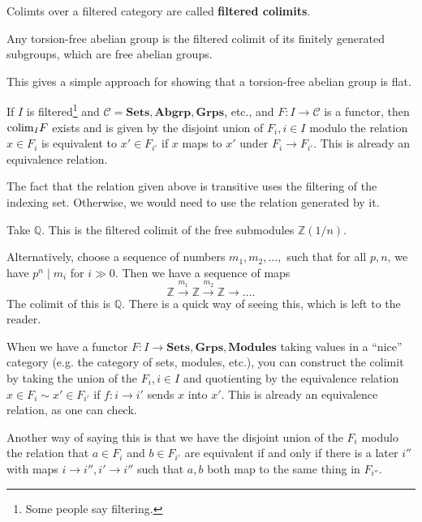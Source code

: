 \begin{definition} 
Colimts over a filtered category are called \textbf{filtered colimits}.
\end{definition} 

\begin{example} 
Any torsion-free abelian group is the filtered colimit of its finitely
generated subgroups, which are free abelian groups.  
\end{example} 
This gives a simple approach for showing that a torsion-free abelian group is
flat.

\begin{proposition} 
If $I$ is filtered\footnote{Some people say filtering.} and $\mathcal{C} =
\mathbf{Sets}, \mathbf{Abgrp}, \mathbf{Grps}$, etc., and $F: I \to \mathcal{C}$
is a functor, then $\mathrm{colim}_I F$ exists and is given by the disjoint union of
$F_i, i \in I$ modulo the relation $x \in F_i$ is equivalent to $x' \in F_{i'}$
if $x$ maps to $x'$ under $F_i \to F_{i'}$. This is already an equivalence
relation. 
\end{proposition} 

The fact that the relation given above is transitive uses the filtering of the
indexing set. Otherwise, we would need to use the relation generated by it. 

\begin{example} 
Take $\mathbb{Q}$. This is the filtered colimit of the free submodules
$\mathbb{Z}(1/n)$.

Alternatively, choose a sequence of numbers $m_1 , m_2, \dots, $ such that for
all $p, n$, we have $p^n \mid m_i$ for $i \gg 0$. Then we have a sequence of
maps
\[ \mathbb{Z} \stackrel{m_1}{\to} \mathbb{Z} \stackrel{m_2}{\to}\mathbb{Z}
\to \dots.   \]
The colimit of this is $\mathbb{Q}$. There is a quick way of seeing this, which
is left to the reader.
\end{example} 

When we have a functor $F: I \to \mathbf{Sets}, \mathbf{Grps},
\mathbf{Modules}$ taking values in a ``nice'' category (e.g. the category of
sets, modules, etc.), you can construct the colimit by taking the union of the
$F_i, i \in I$ and quotienting by the equivalence relation $x \in F_i \sim x'
\in F_{i'}$ if $f: i \to i'$ sends $x$ into $x'$. This is already an
equivalence relation, as one can check. 

Another way of saying this is that we have the disjoint union of the $F_i$
modulo the relation that $a \in F_i$ and $b \in F_{i'}$ are equivalent if and
only if there is a later $i''$ with maps $i \to i'', i' \to i''$ such that
$a,b$ both map to the same thing in $F_{i''}$. 


